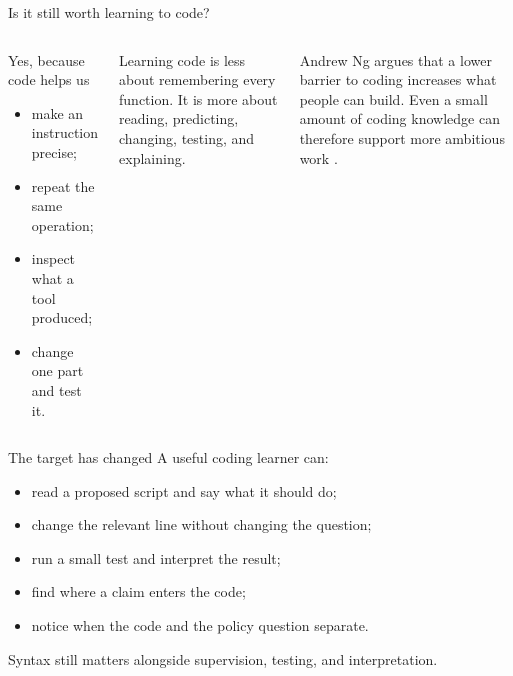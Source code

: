 \begin{frame}{Is it still worth learning to code?}
  \begin{columns}[T,onlytextwidth]
      \begin{block}{Yes, because code helps us}
        \begin{itemize}
          \item make an instruction precise;
          \item repeat the same operation;
          \item inspect what a tool produced;
          \item change one part and test it.
        \end{itemize}
      \end{block}
      Learning code is less about remembering every function. It is more about
      reading, predicting, changing, testing, and explaining.

      \vspace{0.55em}
      Andrew Ng argues that a lower barrier to coding increases what people can
      build. Even a small amount of coding knowledge can therefore support more
      ambitious work \citep{ng2023skills,ng2025trends}.
  \end{columns}
\end{frame}

\begin{frame}{The target has changed}
  A useful coding learner can:
  \begin{itemize}
    \item read a proposed script and say what it should do;
    \item change the relevant line without changing the question;
    \item run a small test and interpret the result;
    \item find where a claim enters the code;
    \item notice when the code and the policy question separate.
  \end{itemize}

  \vfill
  Syntax still matters alongside supervision, testing, and interpretation.
\end{frame}

